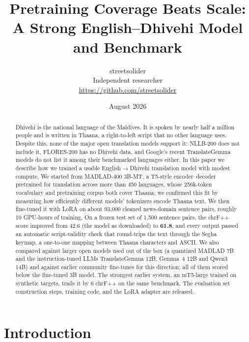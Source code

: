 \documentclass[10pt,twocolumn]{article}
\title{\Large\bf Pretraining Coverage Beats Scale:\\
A Strong English--Dhivehi Model and Benchmark}
\author{streetsolider\\
\small Independent researcher\\
\small \url{https://github.com/streetsolider}}
\date{August 2026}
\begin{document}
\maketitle

\begin{abstract}
Dhivehi is the national language of the Maldives. It is spoken by nearly
half a million people and is written in Thaana, a right-to-left script
that no other language uses. Despite this, none of the major open translation models
support it: NLLB-200 does not include it, FLORES-200 has no Dhivehi data,
and Google's recent TranslateGemma models do not list it among their
benchmarked languages either. In this paper we describe how we trained a
usable English$\to$Dhivehi translation model with modest compute. We
started from MADLAD-400 3B-MT, a T5-style encoder--decoder pretrained for
translation across more than 450 languages, whose 256k-token vocabulary
and pretraining corpus both cover Thaana; we confirmed this fit by
measuring how efficiently different models' tokenizers encode Thaana
text. We then fine-tuned it with LoRA on about 93{,}000 cleaned
news-domain sentence pairs, roughly 10 GPU-hours of training. On a
frozen test set of 1{,}500 sentence pairs, the chrF++ score improved from
42.6 (the model as downloaded) to \textbf{61.8}, and every output passed an
automatic script-validity check that round-trips the text through the Segha
keymap, a one-to-one mapping between Thaana characters and ASCII. We also
compared against larger open models used out of the box (a quantized
MADLAD 7B and the instruction-tuned LLMs TranslateGemma 12B, Gemma~4 12B
and Qwen3 14B) and against earlier community fine-tunes for this
direction; all of them scored below the fine-tuned 3B model. The
strongest earlier system, an mT5-large trained on synthetic targets,
trails it by 6 chrF++ on the same benchmark. The evaluation set
construction steps, training code, and the LoRA adapter are released.
\end{abstract}

\section{Introduction}
\end{document}

